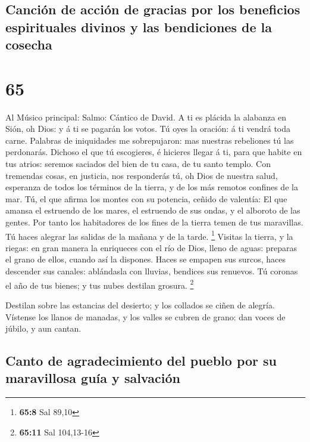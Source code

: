 \hypertarget{canciuxf3n-de-acciuxf3n-de-gracias-por-los-beneficios-espirituales-divinos-y-las-bendiciones-de-la-cosecha}{%
\subsection{Canción de acción de gracias por los beneficios espirituales
divinos y las bendiciones de la
cosecha}\label{canciuxf3n-de-acciuxf3n-de-gracias-por-los-beneficios-espirituales-divinos-y-las-bendiciones-de-la-cosecha}}

\hypertarget{section-64}{%
\section{65}\label{section-64}}

 Al Músico principal: Salmo: Cántico de David. A ti es
plácida la alabanza en Sión, oh Dios: y á ti se pagarán los votos.
 Tú oyes la oración: á ti vendrá toda carne. 
Palabras de iniquidades me sobrepujaron: mas nuestras rebeliones tú las
perdonarás.  Dichoso el que tú escogieres, é hicieres llegar
á ti, para que habite en tus atrios: seremos saciados del bien de tu
casa, de tu santo templo.  Con tremendas cosas, en justicia,
nos responderás tú, oh Dios de nuestra salud, esperanza de todos los
términos de la tierra, y de los más remotos confines de la mar.
 Tú, el que afirma los montes con su potencia, ceñido de
valentía:  El que amansa el estruendo de los mares, el
estruendo de sus ondas, y el alboroto de las gentes.  Por
tanto los habitadores de los fines de la tierra temen de tus maravillas.
Tú haces alegrar las salidas de la mañana y de la tarde. \footnote{\textbf{65:8}
  Sal 89,10}  Visitas la tierra, y la riegas: en gran manera
la enriqueces con el río de Dios, lleno de aguas: preparas el grano de
ellos, cuando así la dispones.  Haces se empapen sus
surcos, haces descender sus canales: ablándasla con lluvias, bendices
sus renuevos.  Tú coronas el año de tus bienes; y tus nubes
destilan grosura. \footnote{\textbf{65:11} Sal 104,13-16}

 Destilan sobre las estancias del desierto; y los collados
se ciñen de alegría.  Vístense los llanos de manadas, y los
valles se cubren de grano: dan voces de júbilo, y aun cantan.

\hypertarget{canto-de-agradecimiento-del-pueblo-por-su-maravillosa-guuxeda-y-salvaciuxf3n}{%
\subsection{Canto de agradecimiento del pueblo por su maravillosa guía y
salvación}\label{canto-de-agradecimiento-del-pueblo-por-su-maravillosa-guuxeda-y-salvaciuxf3n}}

